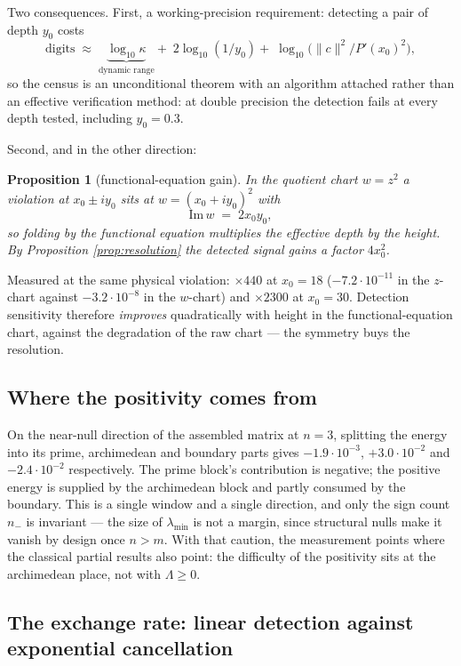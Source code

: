 \documentclass[11pt]{article}
\theoremstyle{plain}
\newtheorem{proposition}[theorem]{Proposition}
\theoremstyle{definition}
\theoremstyle{remark}
\begin{document}
Two consequences. First, a working-precision requirement: detecting a pair of
depth $y_0$ costs
\[
  \text{digits} \;\approx\;
  \underbrace{\log_{10}\kappa}_{\text{dynamic range}}
  +\;2\log_{10}(1/y_0)
  +\;\log_{10}\bigl(\|c\|^2/P'(x_0)^2\bigr),
\]
so the census is an unconditional theorem with an algorithm attached rather
than an effective verification method: at double precision the detection fails
at every depth tested, including $y_0=0.3$.

Second, and in the other direction:

\begin{proposition}[functional-equation gain]\label{prop:fegain}
In the quotient chart $w=z^2$ a violation at $x_0\pm iy_0$ sits at
$w=(x_0+iy_0)^2$ with
\[
  \mathrm{Im}\,w \;=\; 2x_0y_0 ,
\]
so folding by the functional equation multiplies the effective depth by the
height. By Proposition \ref{prop:resolution} the detected signal gains a
factor $4x_0^2$.
\end{proposition}

Measured at the same physical violation: $\times440$ at $x_0=18$
($-7.2\cdot10^{-11}$ in the $z$-chart against $-3.2\cdot10^{-8}$ in the
$w$-chart) and $\times2300$ at $x_0=30$. Detection sensitivity therefore
\emph{improves} quadratically with height in the functional-equation chart,
against the degradation of the raw chart --- the symmetry buys the resolution.

\subsection{Where the positivity comes from}

On the near-null direction of the assembled matrix at $n=3$, splitting the
energy into its prime, archimedean and boundary parts gives $-1.9\cdot10^{-3}$,
$+3.0\cdot10^{-2}$ and $-2.4\cdot10^{-2}$ respectively. The prime block's
contribution is negative; the positive energy is supplied by the archimedean
block and partly consumed by the boundary. This is a single window and a
single direction, and only the sign count $n_-$ is invariant --- the size of
$\lambda_{\min}$ is not a margin, since structural nulls make it vanish by
design once $n>m$. With that caution, the measurement points where the
classical partial results also point: the difficulty of the positivity sits at
the archimedean place, not with $\Lambda\ge0$.

\subsection{The exchange rate: linear detection against exponential
cancellation}\label{sec:exchange}
\end{document}
